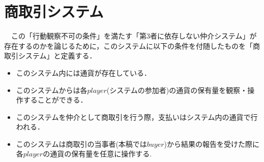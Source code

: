 \section{商取引システム}
　この「行動観察不可の条件」を満たす「第3者に依存しない仲介システム」が存在するのかを論じるために，このシステムに以下の条件を付随したものを「商取引システム」と定義する．
  \begin{itemize}
    \item このシステム内には通貨が存在している．
    \item このシステムからは各$player$(システムの参加者)の通貨の保有量を観察・操作することができる．
    \item このシステムを仲介として商取引を行う際，支払いはシステム内の通貨で行われる．
    \item このシステムは商取引の当事者(本稿では$buyer$)から結果の報告を受けた際に各$player$の通貨の保有量を任意に操作する.
  \end{itemize}